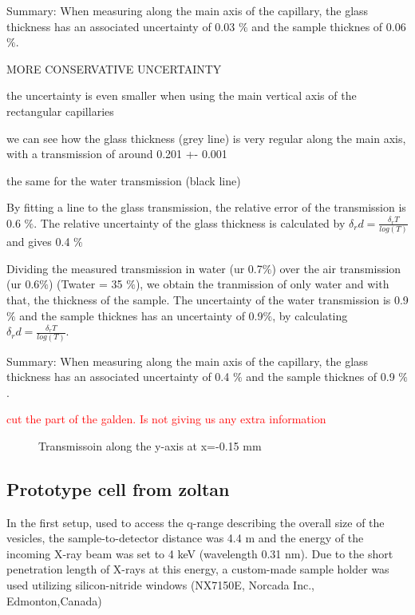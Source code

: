 Summary: When measuring along the main axis of the capillary, the glass thickness has an associated uncertainty of 0.03 $\%$ and the sample thicknes of 0.06 $\%$.


MORE CONSERVATIVE UNCERTAINTY

the uncertainty is even smaller when using the main vertical axis of the rectangular capillaries

we can see how the glass thickness (grey line) is very regular along the main axis, with a transmission of around 0.201 +- 0.001

the same for the water transmission (black line)

By fitting a line to the glass transmission, the relative error of the transmission is 0.6 $\%$. The relative uncertainty of the glass thickness is calculated by $\delta_r d = \frac{\delta_r T}{log(T)}$ and gives 0.4 $\%$

Dividing the measured transmission in water (ur 0.7$\%$) over the air transmission (ur 0.6$\%$) (Twater = 35 $\%$), we obtain the tranmission of only water and with that, the thickness of the sample. The uncertainty of the water transmission is 0.9 $\%$ and the sample thicknes has an uncertainty of 0.9$\%$, by calculating $\delta_r d = \frac{\delta_r T}{log(T)}$.

Summary: When measuring along the main axis of the capillary, the glass thickness has an associated uncertainty of 0.4 $\%$ and the sample thicknes of 0.9 $\%$.

\textcolor{red}{cut the part of the galden. Is not giving us any extra information}

\begin{figure}%
	\centering
		
		\caption{Transmissoin along the y-axis at x=-0.15 mm}
		\label{fig:GaldenCalibration}
\end{figure}

\subsection{Prototype cell from zoltan}

In the first setup, used to access the q-range describing the overall size of the vesicles, the sample-to-detector distance was 4.4 m and the energy of the incoming X-ray beam was set to 4 keV (wavelength 0.31 nm). Due to the short penetration length of X-rays at this energy, a custom-made sample holder was used utilizing silicon-nitride windows (NX7150E, Norcada Inc., Edmonton,Canada)

